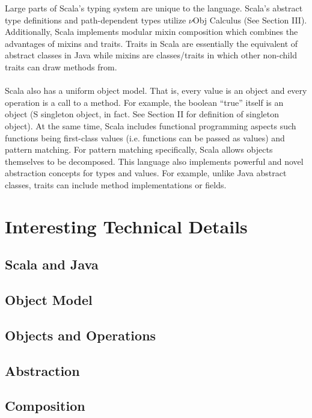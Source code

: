 \documentclass[jou,apacite]{IEEEtran}
\begin{document}
Large parts of Scala's typing system are unique to the language. Scala's abstract type definitions and path-dependent types utilize $\nu$Obj Calculus (See Section III). Additionally, Scala implements modular mixin composition which combines the advantages of mixins and traits. Traits in Scala are essentially the equivalent of abstract classes in Java while mixins are classes/traits in which other non-child traits can draw methods from. \\\\
Scala also has a uniform object model. That is, every value is an object and
every operation is a call to a method. For example, the boolean “true” itself is
an object (S singleton object, in fact. See Section II for definition of
singleton object). At the same time, Scala includes functional programming
aspects such functions being first-class values (i.e. functions can be passed as
values) and pattern matching. For pattern matching specifically, Scala allows
objects themselves to be decomposed. This language also implements powerful and
novel abstraction concepts for types and values. For example, unlike Java
abstract classes, traits can include method implementations or fields.

\section{Interesting Technical Details}

\subsection{Scala and Java}

\subsection{Object Model}

\subsection{Objects and Operations}

\subsection{Abstraction}

\subsection{Composition}
\end{document}
